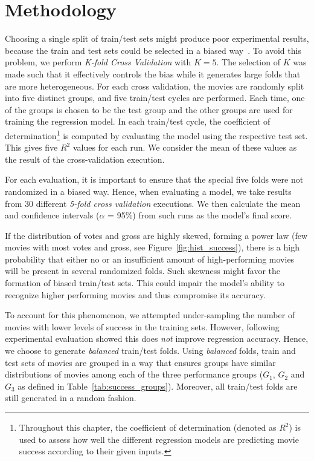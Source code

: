 \section{Methodology}
\label{sec:method}
Choosing a single split of train/test sets might produce poor experimental
results, because the train and test sets could be selected in a biased
way~\citep{mohri2012foundations}. To avoid this problem, we perform
\textit{K-fold Cross Validation} with $K = 5$.  The selection of $K$ was made
such that it effectively controls the bias while it generates large folds that
are more heterogeneous. For each cross validation, the movies are randomly
split into five distinct groups, and five train/test cycles are performed. Each
time, one of the groups is chosen to be the test group and the other groups are
used for training the regression model. In each train/test cycle, the
coefficient of determination\footnote{Throughout this chapter, the coefficient
of determination (denoted as \textbf{$R^2$}) is used to assess how well the
different regression models are predicting movie success according to their
given inputs.} is computed by evaluating the model using the respective test
set. This gives five $R^2$ values for each run. We consider the mean of these
values as the result of the cross-validation execution.

For each evaluation, it is important to ensure that the special five folds were
not randomized in a biased way. Hence, when evaluating a model, we take results
from 30 different \textit{5-fold cross validation} executions. We then
calculate the mean and confidence intervals ($\alpha$ = 95\%) from such runs as
the model's final score.
 
If the distribution of votes and gross are highly skewed, forming a power law 
(few movies with most votes and gross, see Figure~\ref{fig:hist_success}), 
there is a high probability that either no or an insufficient amount of 
high-performing movies will be present in several randomized folds. Such skewness 
might favor the formation of biased train/test sets. This could impair the model's 
ability to recognize higher performing movies and thus compromise its accuracy.

To account for this phenomenon, we attempted under-sampling the number of
movies with lower levels of success in the training sets. However, following
experimental evaluation showed this does \textit{not} improve regression
accuracy.  Hence, we choose to generate \textit{balanced} train/test folds.
Using \textit{balanced} folds, train and test sets of movies are grouped in a
way that ensures groups have similar distributions of movies among each of the
three performance groups ($G_1$, $G_2$ and $G_3$ as defined in
Table~\ref{tab:success_groups}). Moreover, all train/test folds are still
generated in a random fashion.

